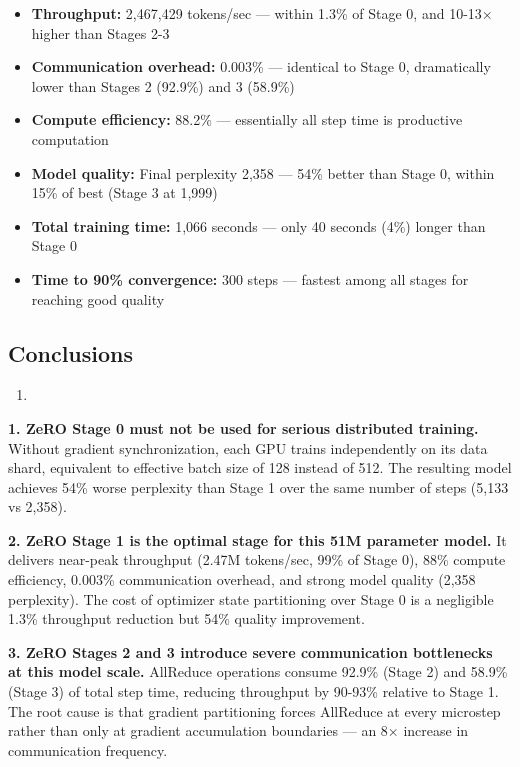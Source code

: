 \begin{itemize}[leftmargin=1.5em, itemsep=4pt]
  \item \textbf{Throughput:} 2,467,429 tokens/sec — within 1.3\% of Stage 0, and 10-13× higher than Stages 2-3
  
  \item \textbf{Communication overhead:} 0.003\% — identical to Stage 0, dramatically lower than Stages 2 (92.9\%) and 3 (58.9\%)
  
  \item \textbf{Compute efficiency:} 88.2\% — essentially all step time is productive computation
  
  \item \textbf{Model quality:} Final perplexity 2,358 — 54\% better than Stage 0, within 15\% of best (Stage 3 at 1,999)
  
  \item \textbf{Total training time:} 1,066 seconds — only 40 seconds (4\%) longer than Stage 0
  
  \item \textbf{Time to 90\% convergence:} 300 steps — fastest among all stages for reaching good quality
\end{itemize}


\subsection{Conclusions}
\begin{enumerate}
    \item 
\end{enumerate}
\textbf{1. ZeRO Stage 0 must not be used for serious distributed training.}
Without gradient synchronization, each GPU trains independently on its data shard, equivalent to effective batch size of 128 instead of 512. The resulting model achieves 54\% worse perplexity than Stage 1 over the same number of steps (5,133 vs 2,358).

\textbf{2. ZeRO Stage 1 is the optimal stage for this 51M parameter model.}
It delivers near-peak throughput (2.47M tokens/sec, 99\% of Stage 0), 88\% compute efficiency, 0.003\% communication overhead, and strong model quality (2,358 perplexity). The cost of optimizer state partitioning over Stage 0 is a negligible 1.3\% throughput reduction but 54\% quality improvement.

\textbf{3. ZeRO Stages 2 and 3 introduce severe communication bottlenecks at this model scale.}
AllReduce operations consume 92.9\% (Stage 2) and 58.9\% (Stage 3) of total step time, reducing throughput by 90-93\% relative to Stage 1. The root cause is that gradient partitioning forces AllReduce at every microstep rather than only at gradient accumulation boundaries — an 8× increase in communication frequency.

